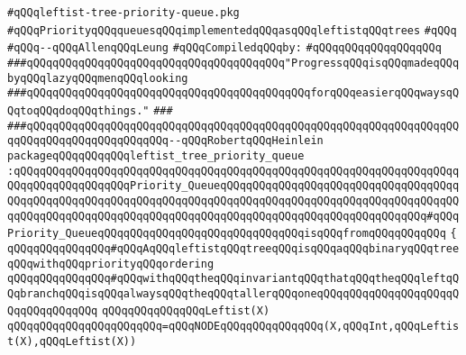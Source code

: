 \label{src/lib/src/leftist-tree-priority-queue.pkg}
\verb|#qQQqleftist-tree-priority-queue.pkg|\newline
\verb|#qQQqPriorityqQQqqueuesqQQqimplementedqQQqasqQQqleftistqQQqtrees|\newline
\verb|#qQQq|\newline
\verb|#qQQq--qQQqAllenqQQqLeung|\newline
\newline
\verb|#qQQqCompiledqQQqby:|\newline
\verb|#qQQqqQQqqQQqqQQqqQQq|\newline
\newline
\verb|###qQQqqQQqqQQqqQQqqQQqqQQqqQQqqQQqqQQqqQQq"ProgressqQQqisqQQqmadeqQQqbyqQQqlazyqQQqmenqQQqlooking|\newline
\verb|###qQQqqQQqqQQqqQQqqQQqqQQqqQQqqQQqqQQqqQQqqQQqforqQQqeasierqQQqwaysqQQqtoqQQqdoqQQqthings."|\newline
\verb|###|\newline
\verb|###qQQqqQQqqQQqqQQqqQQqqQQqqQQqqQQqqQQqqQQqqQQqqQQqqQQqqQQqqQQqqQQqqQQqqQQqqQQqqQQqqQQqqQQqqQQq--qQQqRobertqQQqHeinlein|\newline
\newline
\newline
\newline
\verb|packageqQQqqQQqqQQqleftist_tree_priority_queue|\newline
\verb|:qQQqqQQqqQQqqQQqqQQqqQQqqQQqqQQqqQQqqQQqqQQqqQQqqQQqqQQqqQQqqQQqqQQqqQQqqQQqqQQqqQQqqQQqPriority_QueueqQQqqQQqqQQqqQQqqQQqqQQqqQQqqQQqqQQqqQQqqQQqqQQqqQQqqQQqqQQqqQQqqQQqqQQqqQQqqQQqqQQqqQQqqQQqqQQqqQQqqQQqqQQqqQQqqQQqqQQqqQQqqQQqqQQqqQQqqQQqqQQqqQQqqQQqqQQqqQQqqQQqqQQqqQQq#qQQqPriority_QueueqQQqqQQqqQQqqQQqqQQqqQQqqQQqqQQqisqQQqfromqQQqqQQqqQQq|\newline
\verb|{|\newline
\verb|qQQqqQQqqQQqqQQq#qQQqAqQQqleftistqQQqtreeqQQqisqQQqaqQQqbinaryqQQqtreeqQQqwithqQQqpriorityqQQqordering|\newline
\verb|qQQqqQQqqQQqqQQq#qQQqwithqQQqtheqQQqinvariantqQQqthatqQQqtheqQQqleftqQQqbranchqQQqisqQQqalwaysqQQqtheqQQqtallerqQQqoneqQQqqQQqqQQqqQQqqQQqqQQqqQQqqQQqqQQq|\newline
\newline
\verb|qQQqqQQqqQQqqQQqLeftist(X)|\newline
\verb|qQQqqQQqqQQqqQQqqQQqqQQq=qQQqNODEqQQqqQQqqQQqqQQq(X,qQQqInt,qQQqLeftist(X),qQQqLeftist(X))|\newline
